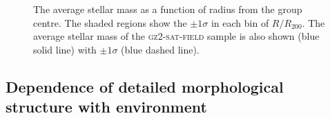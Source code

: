 \begin{figure}
\caption[Average mass with group radius in the GZ2-GROUP sample]{The average stellar mass as a function of radius from the group centre. The shaded regions show the $\pm1\sigma$ in each bin of $R/R_{200}$. The average stellar mass of the \textsc{gz2-sat-field} sample is also shown (blue solid line) with $\pm1\sigma$ (blue dashed line).}
\label{fig:massdep}
\end{figure}



\subsection{Dependence of detailed morphological structure with environment}\label{sec:resmorph}


